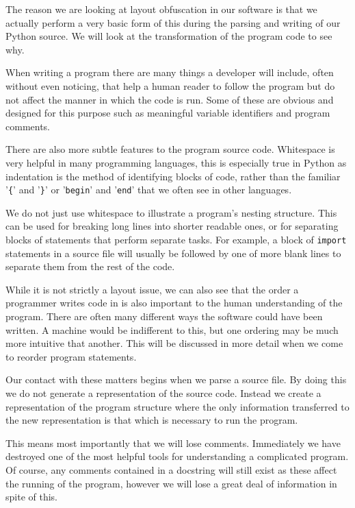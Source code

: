 \documentclass[twoside,a4paper]{report}
\begin{document}
The reason we are looking at layout obfuscation in our software is that we actually perform a very basic
form of this during the parsing and writing of our Python source. We will look at the transformation of the
program code to see why.

When writing a program there are many things a developer will include, often without even noticing, that
help a human reader to follow the program but do not affect the manner in which the code is run. Some of
these are obvious and designed for this purpose such as meaningful variable identifiers and program comments.

There are also more subtle features to the program source code. Whitespace is very helpful in many programming
languages, this is especially true in Python as indentation is the method of identifying blocks of code, rather than
the familiar '\texttt{\{}' and '\texttt{\}}' or '\texttt{begin}' and '\texttt{end}' that we often see in other
languages. 

We do not just use whitespace to illustrate a program's nesting structure. This can be used for breaking long lines
into shorter readable ones, or for separating blocks of statements that perform separate tasks. For example, a block
of \texttt{import} statements in a source file will usually be followed by one of more blank lines to separate them
from the rest of the code.

While it is not strictly a layout issue, we can also see that the order a programmer writes code in is also important
to the human understanding of the program. There are often many different ways the software could have been written.
A machine would be indifferent to this, but one ordering may be much more intuitive that another. This will be discussed
in more detail when we come to reorder program statements.

Our contact with these matters begins when we parse a source file. By doing this we do not generate a representation of
the source code. Instead we create a representation of the program structure where the only information transferred to the
new representation is that which is necessary to run the program.

This means most importantly that we will lose comments. Immediately we have destroyed one of the most helpful tools
for understanding a complicated program. Of course, any comments contained in a docstring will still exist as these
affect the running of the program, however we will lose a great deal of information in spite of this.
\end{document}
